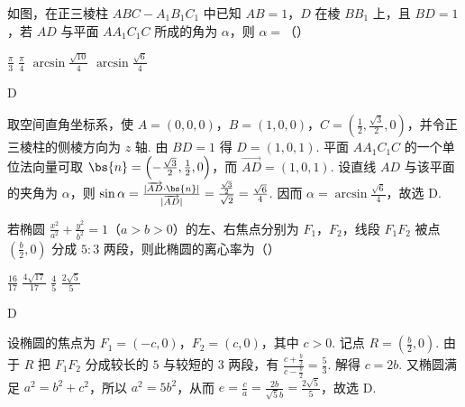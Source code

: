 \begin{problem}
如图，在正三棱柱 \(ABC - A_{1}B_{1}C_{1}\) 中已知 \(AB = 1\)，\(D\) 在棱 \(BB_{1}\) 上，且 \(BD = 1\)，若 \(AD\) 与平面 \(AA_{1}C_{1}C\) 所成的角为 \(\alpha\)，则 \(\alpha =\)（\quad）


\choices
    {\(\frac{\pi}{3}\)}
    {\(\frac{\pi}{4}\)}
    {\(\arcsin \frac{\sqrt{10}}{4}\)}
    {\(\arcsin \frac{\sqrt{6}}{4}\)}
\end{problem}

\begin{answer}
D
\end{answer}

\begin{solution}
取空间直角坐标系，使
\(A=(0,0,0)\)，\(B=(1,0,0)\)，\(C=\left(\frac{1}{2},\frac{\sqrt{3}}{2},0\right)\)，并令正三棱柱的侧棱方向为 \(z\) 轴. 由 \(BD=1\) 得 \(D=(1,0,1)\). 平面 \(AA_1C_1C\) 的一个单位法向量可取 \(\bs{n}=\left(-\frac{\sqrt{3}}{2},\frac{1}{2},0\right)\)，而 \(\overrightarrow{AD}=(1,0,1)\). 设直线 \(AD\) 与该平面的夹角为 \(\alpha\)，则
\(\sin\alpha=\frac{|\overrightarrow{AD}\cdot\bs{n}|}{|\overrightarrow{AD}|}=\frac{\frac{\sqrt{3}}{2}}{\sqrt{2}}=\frac{\sqrt{6}}{4}\). 因而 \(\alpha=\arcsin\frac{\sqrt{6}}{4}\)，故选 D.
\end{solution}

\begin{problem}
若椭圆 \(\frac{x^{2}}{a^{2}} + \frac{y^{2}}{b^{2}} = 1\)（\(a > b > 0\)）的左、右焦点分别为 \(F_1\)，\(F_2\)，线段 \(F_1F_2\) 被点 \(\left(\frac{b}{2}, 0\right)\) 分成 \(5:3\) 两段，则此椭圆的离心率为（\quad）

\choices
    {\(\frac{16}{17}\)}
    {\(\frac{4\sqrt{17}}{17}\)}
    {\(\frac{4}{5}\)}
    {\(\frac{2\sqrt{5}}{5}\)}
\end{problem}

\begin{answer}
D
\end{answer}

\begin{solution}
设椭圆的焦点为 \(F_1=(-c,0)\)，\(F_2=(c,0)\)，其中 \(c>0\). 记点 \(R=\left(\frac{b}{2},0\right)\). 由于 \(R\) 把 \(F_1F_2\) 分成较长的 \(5\) 与较短的 \(3\) 两段，有
\(\frac{c+\frac{b}{2}}{c-\frac{b}{2}}=\frac{5}{3}\). 解得 \(c=2b\). 又椭圆满足 \(a^2=b^2+c^2\)，所以 \(a^2=5b^2\)，从而
\(e=\frac{c}{a}=\frac{2b}{\sqrt{5}b}=\frac{2\sqrt{5}}{5}\)，故选 D.
\end{solution}


